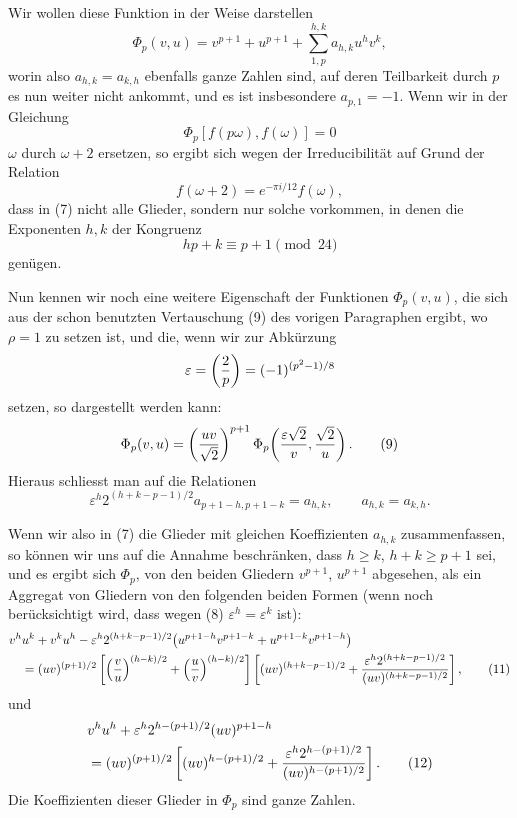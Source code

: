 \documentclass[11pt]{article}
\begin{document}
Wir wollen diese Funktion in der Weise darstellen
\begin{equation}
 \Phi_p(v,u)=v^{p+1}+u^{p+1}+\sum_{1,p}^{h,k}a_{h,k}u^hv^k,
\tag{7}
\end{equation}
worin also $a_{h,k}=a_{k,h}$ ebenfalls ganze Zahlen sind, auf deren Teilbarkeit durch $p$ es nun weiter nicht ankommt, und es ist insbesondere $a_{p,1}=-1$. Wenn wir in der Gleichung
\[
 \Phi_p[f(p\omega),f(\omega)]=0
\]
$\omega$ durch $\omega+2$ ersetzen, so ergibt sich wegen der Irreducibilität auf Grund der Relation
\[
 f(\omega+2)=e^{-\pi i/12}f(\omega),
\]
dass in (7) nicht alle Glieder, sondern nur solche vorkommen, in denen die Exponenten $h,k$ der Kongruenz
\begin{equation}
 hp+k\equiv p+1\pmod{24}
\tag{8}
\end{equation}
genügen.

Nun kennen wir noch eine weitere Eigenschaft der Funktionen $\Phi_p(v,u)$, die sich aus der schon benutzten Vertauschung (9) des vorigen Paragraphen ergibt, wo $\rho=1$ zu setzen ist, und die, wenn wir zur Abkürzung
\[
 \varepsilon=\left({2\over p}\right)=(-1)^{(p^2-1)/8}
\]
setzen, so dargestellt werden kann:
\begin{equation}
 \Phi_p(v,u)=\left({uv\over\sqrt2}\right)^{p+1}
 \Phi_p\!\left({\varepsilon\sqrt2\over v},{\sqrt2\over u}\right).
\tag{9}
\end{equation}
Hieraus schliesst man auf die Relationen
\begin{equation}
 \varepsilon^h2^{(h+k-p-1)/2}a_{p+1-h,p+1-k}=a_{h,k},
 \qquad a_{h,k}=a_{k,h}.
\tag{10}
\end{equation}

Wenn wir also in (7) die Glieder mit gleichen Koeffizienten $a_{h,k}$ zusammenfassen, so können wir uns auf die Annahme beschränken, dass $h\ge k$, $h+k\ge p+1$ sei, und es ergibt sich $\Phi_p$, von den beiden Gliedern $v^{p+1}$, $u^{p+1}$ abgesehen, als ein Aggregat von Gliedern von den folgenden beiden Formen (wenn noch berücksichtigt wird, dass wegen (8) $\varepsilon^h=\varepsilon^k$ ist):
\begin{align}
& v^hu^k+v^ku^h
 -\varepsilon^h2^{(h+k-p-1)/2}
 \bigl(u^{p+1-h}v^{p+1-k}+u^{p+1-k}v^{p+1-h}\bigr)
\notag\\
&\quad=(uv)^{(p+1)/2}
 \left[\left({v\over u}\right)^{(h-k)/2}
       +\left({u\over v}\right)^{(h-k)/2}\right]
 \left[(uv)^{(h+k-p-1)/2}
       +{\varepsilon^h2^{(h+k-p-1)/2}\over(uv)^{(h+k-p-1)/2}}\right],
\tag{11}
\end{align}
und
\begin{align}
& v^hu^h+\varepsilon^h2^{h-(p+1)/2}(uv)^{p+1-h}
\notag\\
&=(uv)^{(p+1)/2}
 \left[(uv)^{h-(p+1)/2}
       +{\varepsilon^h2^{h-(p+1)/2}\over(uv)^{h-(p+1)/2}}\right].
\tag{12}
\end{align}
Die Koeffizienten dieser Glieder in $\Phi_p$ sind ganze Zahlen.
\end{document}

